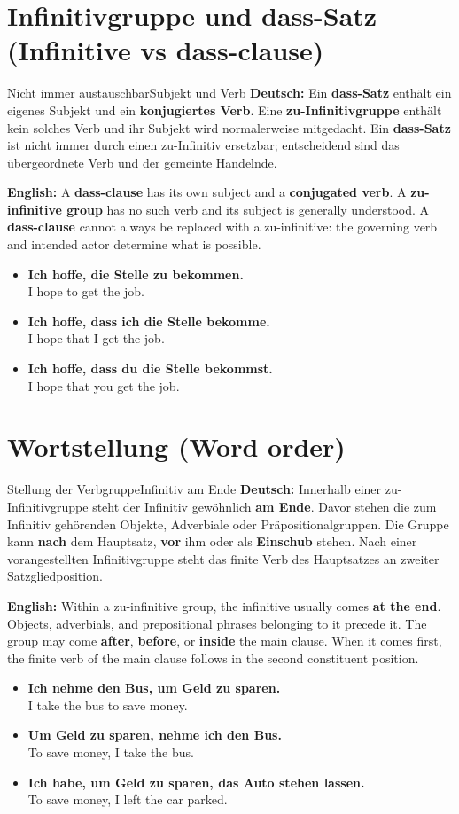 \documentclass[a4paper,11pt]{article}
\newcommand{\GermanText}[1]{\textbf{Deutsch: }#1\par}
\newcommand{\EnglishText}[1]{{\small\color{SoftGray}\textbf{English: }#1\par}}
\newcommand{\ExampleItem}[2]{\item \textbf{#1}\\{\small\color{SoftGray}#2}}
\begin{document}
\section{Infinitivgruppe und dass-Satz \textnormal{(Infinitive vs dass-clause)}}
\begin{grammarentry}{Nicht immer austauschbar}{Subjekt und Verb}
\GermanText{Ein \textbf{dass-Satz} enthält ein eigenes Subjekt und ein \textbf{konjugiertes Verb}. Eine \textbf{zu-Infinitivgruppe} enthält kein solches Verb und ihr Subjekt wird normalerweise mitgedacht. Ein \textbf{dass-Satz} ist nicht immer durch einen zu-Infinitiv ersetzbar; entscheidend sind das übergeordnete Verb und der gemeinte Handelnde.}
\EnglishText{A \textbf{dass-clause} has its own subject and a \textbf{conjugated verb}. A \textbf{zu-infinitive group} has no such verb and its subject is generally understood. A \textbf{dass-clause} cannot always be replaced with a zu-infinitive: the governing verb and intended actor determine what is possible.}
\end{grammarentry}
\begin{exbox}\begin{itemize}
\ExampleItem{Ich hoffe, die Stelle zu bekommen.}{I hope to get the job.}
\ExampleItem{Ich hoffe, dass ich die Stelle bekomme.}{I hope that I get the job.}
\ExampleItem{Ich hoffe, dass du die Stelle bekommst.}{I hope that you get the job.}
\end{itemize}\end{exbox}

\section{Wortstellung \textnormal{(Word order)}}
\begin{grammarentry}{Stellung der Verbgruppe}{Infinitiv am Ende}
\GermanText{Innerhalb einer zu-Infinitivgruppe steht der Infinitiv gewöhnlich \textbf{am Ende}. Davor stehen die zum Infinitiv gehörenden Objekte, Adverbiale oder Präpositionalgruppen. Die Gruppe kann \textbf{nach} dem Hauptsatz, \textbf{vor} ihm oder als \textbf{Einschub} stehen. Nach einer vorangestellten Infinitivgruppe steht das finite Verb des Hauptsatzes an zweiter Satzgliedposition.}
\EnglishText{Within a zu-infinitive group, the infinitive usually comes \textbf{at the end}. Objects, adverbials, and prepositional phrases belonging to it precede it. The group may come \textbf{after}, \textbf{before}, or \textbf{inside} the main clause. When it comes first, the finite verb of the main clause follows in the second constituent position.}
\end{grammarentry}
\begin{exbox}\begin{itemize}
\ExampleItem{Ich nehme den Bus, um Geld zu sparen.}{I take the bus to save money.}
\ExampleItem{Um Geld zu sparen, nehme ich den Bus.}{To save money, I take the bus.}
\ExampleItem{Ich habe, um Geld zu sparen, das Auto stehen lassen.}{To save money, I left the car parked.}
\end{itemize}\end{exbox}
\end{document}
